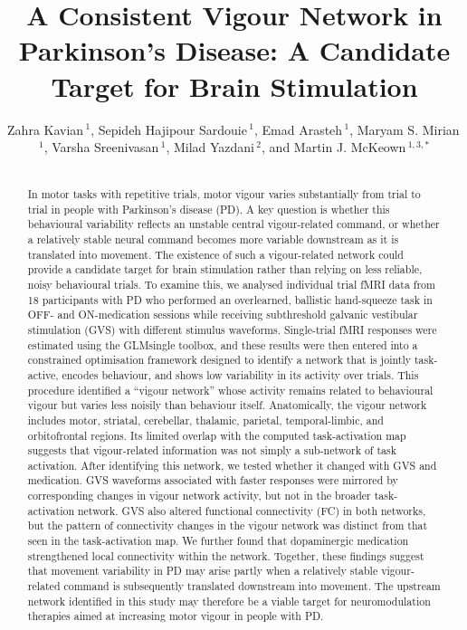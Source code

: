 \documentclass[utf8]{FrontiersinHarvard}
\def\firstAuthorLast{Kavian {et~al.}}
\def\Authors{Zahra Kavian\,$^{1}$, Sepideh Hajipour Sardouie\,$^{1}$, Emad Arasteh\,$^{1}$, Maryam S. Mirian\,$^{1}$, Varsha Sreenivasan\,$^{1}$, Milad Yazdani\,$^{2}$, and Martin J. McKeown\,$^{1,3,*}$}
\begin{document}
\raggedbottom
\onecolumn
{}

\title{A Consistent Vigour Network in Parkinson’s Disease: A Candidate Target for Brain Stimulation}

\author[\firstAuthorLast ]{\Authors}
\address{}
\correspondance{}
\extraAuth{}
\maketitle

\begin{abstract}
\section{}
In motor tasks with repetitive trials, motor vigour varies substantially from trial to trial in people with Parkinson’s disease (PD). A key question is whether this behavioural variability reflects an unstable central vigour-related command, or whether a relatively stable neural command becomes more variable downstream as it is translated into movement. The existence of such a vigour-related network could provide a candidate target for brain stimulation rather than relying on less reliable, noisy behavioural trials. To examine this, we analysed individual trial fMRI data from 18 participants with PD who performed an overlearned, ballistic hand-squeeze task in OFF- and ON-medication sessions while receiving subthreshold galvanic vestibular stimulation (GVS) with different stimulus waveforms. Single-trial fMRI responses were estimated using the GLMsingle toolbox, and these results were then entered into a constrained optimisation framework designed to identify a network that is jointly task-active, encodes behaviour, and shows low variability in its activity over trials. This procedure identified a “vigour network” whose activity remains related to behavioural vigour but varies less noisily than behaviour itself. Anatomically, the vigour network includes motor, striatal, cerebellar, thalamic, parietal, temporal-limbic, and orbitofrontal regions. Its limited overlap with the computed task-activation map suggests that vigour-related information was not simply a sub-network of task activation. After identifying this network, we tested whether it changed with GVS and medication. GVS waveforms associated with faster responses were mirrored by corresponding changes in vigour network activity, but not in the broader task-activation network. GVS also altered functional connectivity (FC) in both networks, but the pattern of connectivity changes in the vigour network was distinct from that seen in the task-activation map. We further found that dopaminergic medication strengthened local connectivity within the network. Together, these findings suggest that movement variability in PD may arise partly when a relatively stable vigour-related command is subsequently translated downstream into movement. The upstream network identified in this study may therefore be a viable target for neuromodulation therapies aimed at increasing motor vigour in people with PD.





\end{abstract}
\end{document}
